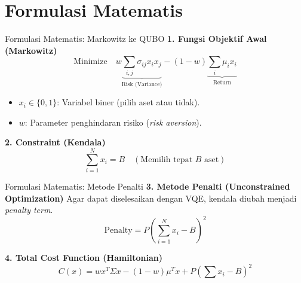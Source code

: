 \documentclass{beamer}
\begin{document}
\section{Formulasi Matematis}
\begin{frame}{Formulasi Matematis: Markowitz ke QUBO}
    \textbf{1. Fungsi Objektif Awal (Markowitz)}
    \begin{equation*}
        \text{Minimize} \quad w \underbrace{\sum_{i,j} \sigma_{ij} x_i x_j}_{\text{Risk (Variance)}} - (1-w) \underbrace{\sum_i \mu_i x_i}_{\text{Return}}
    \end{equation*}
    \begin{itemize}
        	\item $x_i \in \{0, 1\}$: Variabel biner (pilih aset atau tidak).
        	\item $w$: Parameter penghindaran risiko (\textit{risk aversion}).
    \end{itemize}

    \textbf{2. Constraint (Kendala)}
    \begin{equation*}
        \sum_{i=1}^N x_i = B \quad (\text{Memilih tepat } B \text{ aset})
    \end{equation*}
\end{frame}

\begin{frame}{Formulasi Matematis: Metode Penalti}
    \textbf{3. Metode Penalti (Unconstrained Optimization)}
    Agar dapat diselesaikan dengan VQE, kendala diubah menjadi \textit{penalty term}.
    \begin{equation*}
        \text{Penalty} = P \left( \sum_{i=1}^N x_i - B \right)^2
    \end{equation*}
    
    \textbf{4. Total Cost Function (Hamiltonian)}
    \begin{equation*}
        C(x) = w x^T \Sigma x - (1-w) \mu^T x + P \left( \sum x_i - B \right)^2
    \end{equation*}
\end{frame}

\end{document}
